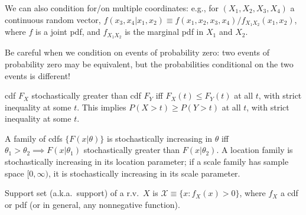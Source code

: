\documentclass[8pt,letterpaper, landscape]{extarticle} %
\newcommand{\X}{\ensuremath{\mathcal{X}}}
\begin{document}
\begin{multicols}{3}
\begin{description}
We can also condition for/on multiple coordinates: e.g., for $ (X_1, X_2, X_3, X_4) $ a continuous random vector, $ f(x_3, x_4|x_1, x_2) \equiv f(x_1, x_2, x_3, x_4) / f_{X_1 X_2}(x_1, x_2) $, where $ f $ is a joint pdf, and $ f_{X_1 X_2} $ is the marginal pdf in $ X_1 $ and $ X_2 $.

 Be careful when we condition on events of probability zero: two events of probability zero may be equivalent, but the probabilities conditional on the two events is different!

 cdf $ F_X $ stochastically greater than cdf $ F_Y $ iff $ F_X(t) \leq F_Y(t) $ at all $ t $, with strict inequality at some $ t $. This implies $ P (X > t) \geq P (Y > t) $ at all $ t $, with strict inequality at some $ t $.

A family of cdfs $ \{ F(x|\theta) \} $ is stochastically increasing in $ \theta $ iff $ \theta_1 > \theta_2 \implies F(x | \theta_1) $ stochastically greater than $ F(x | \theta_2) $. A location family is stochastically increasing in its location parameter; if a scale family has sample space $ [0, \infty) $, it is stochastically increasing in its scale parameter.

 Support set (a.k.a.\ support) of a r.v.\ $ X $ is $ \X \equiv \{ x \colon f_X(x) > 0 \} $, where $ f_X $ a cdf or pdf (or in general, any nonnegative function).


\end{description}
\end{multicols}
\end{document}
